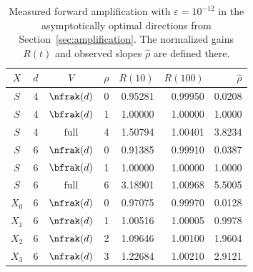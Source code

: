 \begin{table}[tb]
\caption{Measured forward amplification with $\varepsilon=10^{-12}$ in
the asymptotically optimal directions from Section~\ref{sec:amplification}.
The normalized gains $R(t)$ and observed slopes $\widehat\rho$ are defined there.}
\label{tab:amplification}
\centering
\begin{tabular}{crcrrrr}
 $X$ & $d$ & $V$ & $\rho$ & $R(10)$ & $R(100)$ & $\widehat\rho$ \\
\hline
 $S$ & 4 & $\nfrak(d)$ & 0 & 0.95281 & 0.99950 & 0.0208 \\
 $S$ & 4 & $\bfrak(d)$ & 1 & 1.00000 & 1.00000 & 1.0000 \\
 $S$ & 4 & $\mathrm{full}$ & 4 & 1.50794 & 1.00401 & 3.8234 \\
 $S$ & 6 & $\nfrak(d)$ & 0 & 0.91385 & 0.99910 & 0.0387 \\
 $S$ & 6 & $\bfrak(d)$ & 1 & 1.00000 & 1.00000 & 1.0000 \\
 $S$ & 6 & $\mathrm{full}$ & 6 & 3.18901 & 1.00968 & 5.5005 \\
\hline
 $X_0$ & 6 & $\nfrak(d)$ & 0 & 0.97075 & 0.99970 & 0.0128 \\
 $X_1$ & 6 & $\nfrak(d)$ & 1 & 1.00516 & 1.00005 & 0.9978 \\
 $X_2$ & 6 & $\nfrak(d)$ & 2 & 1.09646 & 1.00100 & 1.9604 \\
 $X_3$ & 6 & $\nfrak(d)$ & 3 & 1.22684 & 1.00210 & 2.9121 \\
\end{tabular}
\end{table}
